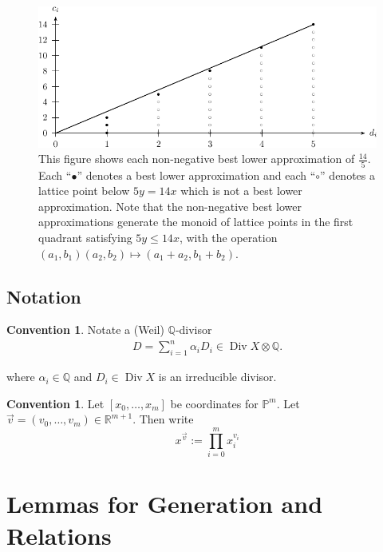 \documentclass{amsart}
\theoremstyle{plain}
\theoremstyle{definition}
\newtheorem{convention}[thm]{Convention}
\theoremstyle{remark}
\numberwithin{equation}{section}
\newcommand\ssec{\subsection}
\newcommand\br{{\mathbb R}}
\newcommand\bq{{\mathbb Q}}
\newcommand\bp{{\mathbb P}}
\DeclareMathOperator\di{Div}
\begin{document}
\begin{figure}
\includegraphics{pics/spin-lower-approximations-pic-pics.pdf}
\caption{This figure shows each non-negative best lower
approximation of $\frac{14}{5}.$ Each ``$\bullet$'' denotes a best
lower approximation and each ``$\circ$'' denotes a lattice point
below $5y=14x$ which is not a best lower approximation.  Note that
the non-negative best lower approximations generate the monoid of
lattice points in the first quadrant satisfying  $5y \le 14x$, with
the operation $(a_1, b_1)(a_2, b_2)\mapsto (a_1 + a_2, b_1 + b_2)$.}
\label{fig:s14/5-lattice}
\end{figure}

\ssec{Notation}
\begin{convention}
Notate a (Weil) $\bq$-divisor
\begin{align*}
	D = \sum_{i=1}^{n}\alpha_i D_i \in \di X \otimes \bq.
\end{align*}

\noindent
where $\alpha_i \in \bq$ and $D_i \in \di X$ is an irreducible divisor.
\end{convention}

\begin{convention}
Let $[x_0, \ldots, x_m]$ be coordinates for $\bp^m$. Let
$\vec{v} = (v_0, \ldots, v_m) \in \br^{m + 1}$. Then write
\[
	x^{\vec{v}} := \prod_{i = 0}^{m} x_i^{v_i}
\]
\end{convention}

\section{Lemmas for Generation and Relations}
\end{document}
